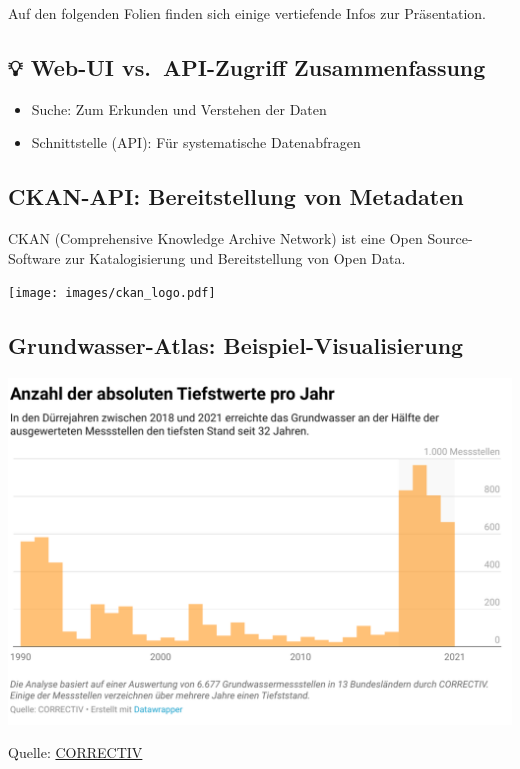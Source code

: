 \documentclass[
  letterpaper,
  DIV=11]{scrartcl}
\providecommand{\tightlist}{%
  \setlength{\itemsep}{0pt}\setlength{\parskip}{0pt}}\usepackage{longtable,booktabs,array}
\begin{document}
Auf den folgenden Folien finden sich einige vertiefende Infos zur
Präsentation.

\subsection{💡 Web-UI vs.~API-Zugriff
Zusammenfassung}\label{web-ui-vs.-api-zugriff-zusammenfassung}

\begin{itemize}
\tightlist
\item
  Suche: Zum Erkunden und Verstehen der Daten
\item
  Schnittstelle (API): Für systematische Datenabfragen
\end{itemize}

\subsection{CKAN-API: Bereitstellung von
Metadaten}\label{ckan-api-bereitstellung-von-metadaten}

CKAN (Comprehensive Knowledge Archive Network) ist eine Open
Source-Software zur Katalogisierung und Bereitstellung von Open Data.
\begin{center}
\texttt{[image: images/ckan\_logo.pdf]}
\end{center}

\subsection{Grundwasser-Atlas:
Beispiel-Visualisierung}\label{grundwasser-atlas-beispiel-visualisierung}

\includegraphics[width=0.8\linewidth,height=0.8\textheight]{images/correctiv_anzahl_tiefstwerte.png}

Quelle:
\href{https://correctiv.org/aktuelles/kampf-um-wasser/2022/10/25/klimawandel-grundwasser-in-deutschland-sinkt/}{CORRECTIV}
\end{document}
